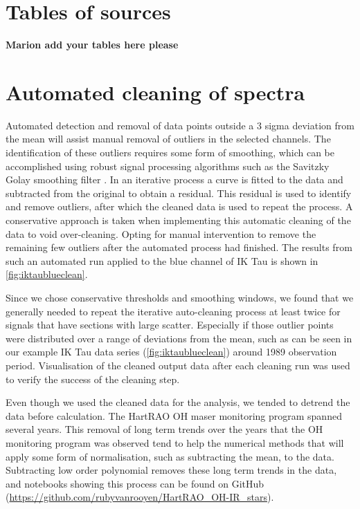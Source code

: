 \section{Tables of sources}
\label{app:sources}
{\color {red}
\textbf{Marion add your tables here please}
}


\section{Automated cleaning of spectra}
\label{app:cleaning}

Automated detection and removal of data points outside a 3 sigma deviation from the mean will assist manual removal of outliers in the selected channels.
The identification of these outliers requires some form of smoothing, which can be accomplished using robust signal processing algorithms such as the Savitzky Golay smoothing filter
\citep{1964AnaCh..36.1627S}.
In an iterative process a curve is fitted to the data and subtracted from the original to obtain a residual.
This residual is used to identify and remove outliers, after which the cleaned data is used to repeat the process.
A conservative approach is taken when implementing this automatic cleaning of the data to void over-cleaning.
Opting for manual intervention to remove the remaining few outliers after the automated process had finished.
The results from such an automated run applied to the blue channel of IK Tau is shown in \cref{fig:iktaublueclean}.

Since we chose conservative thresholds and smoothing windows, we found that we generally needed to repeat the iterative auto-cleaning process at least twice for signals that have sections with large scatter.
Especially if those outlier points were distributed over a range of deviations from the mean, such as can be seen in our example IK Tau data series (\cref{fig:iktaublueclean}) around 1989 observation period.
Visualisation of the cleaned output data after each cleaning run was used to verify the success of the cleaning step.

Even though we used the cleaned data for the analysis, we tended to detrend the data before calculation.
The HartRAO OH maser monitoring program spanned several years.
This removal of long term trends over the years that the OH monitoring program was observed tend to help the numerical methods that will apply some form of normalisation, such as subtracting the mean, to the data.
Subtracting low order polynomial removes these long term trends in the data, and notebooks showing this process can be found on GitHub (\mbox{\url{https://github.com/rubyvanrooyen/HartRAO_OH-IR_stars}}).
